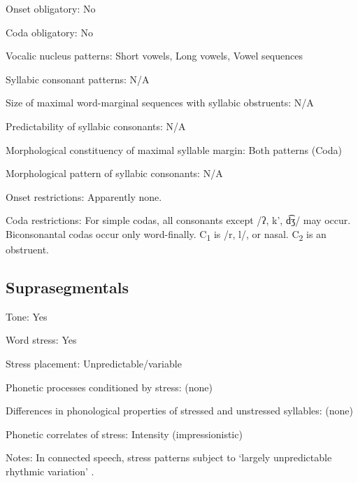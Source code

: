 {\begin{appendixdesc}
\item[Onset obligatory:] No

\item[Coda obligatory:] No

\item[Vocalic nucleus patterns:] Short vowels, Long vowels, Vowel sequences

\item[Syllabic consonant patterns:] N/A

\item[Size of maximal word-marginal sequences with syllabic obstruents:] N/A

\item[Predictability of syllabic consonants:] N/A

\item[Morphological constituency of maximal syllable margin:] Both patterns (Coda)

\item[Morphological pattern of syllabic consonants:] N/A

\item[Onset restrictions:] Apparently none.

\item[Coda restrictions:] For simple codas, all consonants except /ʔ, k’, d͡ʒ/ may occur. Biconsonantal codas occur only word-finally. C\textsubscript{1} is /r, l/, or nasal. C\textsubscript{2} is an obstruent.
\end{appendixdesc}
\subsection*{Suprasegmentals}
\begin{appendixdesc}
\item[Tone:] Yes

\item[Word stress:] Yes

\item[Stress placement:] Unpredictable/variable

\item[Phonetic processes conditioned by stress:] (none)

\item[Differences in phonological properties of stressed and unstressed syllables:] (none)

\item[Phonetic correlates of stress:] Intensity (impressionistic)

\item[Notes:] In connected speech, stress patterns subject to ‘largely unpredictable rhythmic variation’ \citep[12--13]{Crewe1975}.
\end{appendixdesc}
}
